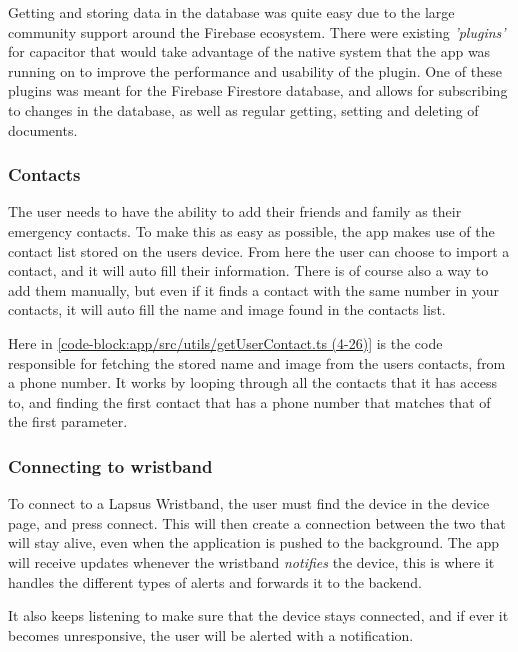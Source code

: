 Getting and storing data in the database was quite easy due to the large community support around the Firebase ecosystem. There were existing \textit{'plugins'} for capacitor that would take advantage of the native system that the app was running on to improve the performance and usability of the plugin. One of these plugins was meant for the Firebase Firestore database, and allows for subscribing to changes in the database, as well as regular getting, setting and deleting of documents.

\subsubsection{Contacts}
The user needs to have the ability to add their friends and family as their emergency contacts. To make this as easy as possible, the app makes use of the contact list stored on the users device. From here the user can choose to import a contact, and it will auto fill their information. There is of course also a way to add them manually, but even if it finds a contact with the same number in your contacts, it will auto fill the name and image found in the contacts list.


Here in \autoref{code-block:app/src/utils/getUserContact.ts (4-26)} is the code responsible for fetching the stored name and image from the users contacts, from a phone number. It works by looping through all the contacts that it has access to, and finding the first contact that has a phone number that matches that of the first parameter. 


\subsubsection{Connecting to wristband}

To connect to a Lapsus Wristband, the user must find the device in the device page, and press connect. This will then create a connection between the two that will stay alive, even when the application is pushed to the background. The app will receive updates whenever the wristband \textit{notifies} the device, this is where it handles the different types of alerts and forwards it to the backend.

It also keeps listening to make sure that the device stays connected, and if ever it becomes unresponsive, the user will be alerted with a notification.

